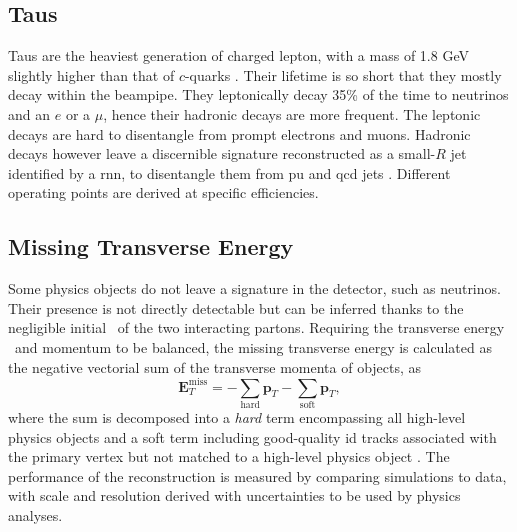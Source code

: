 \subsection{Taus}\label{sec-atlas-tau}
Taus are the heaviest generation of charged lepton, with a mass of 1.8 GeV slightly higher than that of $c$-quarks \cite{Tanabashi:2018oca}. Their lifetime is so short that they mostly decay within the beampipe. They leptonically decay 35\% of the time to neutrinos and an $e$ or a $\mu$, hence their hadronic decays are more frequent. The leptonic decays are hard to disentangle from prompt electrons and muons. Hadronic decays however leave a discernible signature reconstructed as a small-$R$ jet identified by a \gls{rnn}, to disentangle them from \gls{pu} and \gls{qcd} jets \cite{ATL-PHYS-PUB-2019-033}. Different operating points are derived at specific efficiencies. 

\subsection{Missing Transverse Energy}\label{sec-atlas-met}
Some physics objects do not leave a signature in the detector, such as neutrinos. Their presence is not directly detectable but can be inferred thanks to the negligible initial \pt\ of the two interacting partons. Requiring the transverse energy \etm\ and momentum to be balanced, the missing transverse energy is calculated as the negative vectorial sum of the transverse momenta of objects, as
\begin{equation}
  \boldsymbol{E}_T^{\text{miss}} = - \sum_{\text{hard}} \boldsymbol{p}_T - \sum_{\text{soft}} \boldsymbol{p}_T,
\end{equation}
where the sum is decomposed into a \textit{hard} term encompassing all high-level physics objects and a soft term including good-quality \gls{id} tracks associated with the primary vertex but not matched to a high-level physics object \cite{ATLASmetReco}. The performance of the reconstruction is measured by comparing simulations to data, with scale and resolution derived with uncertainties to be used by physics analyses. 